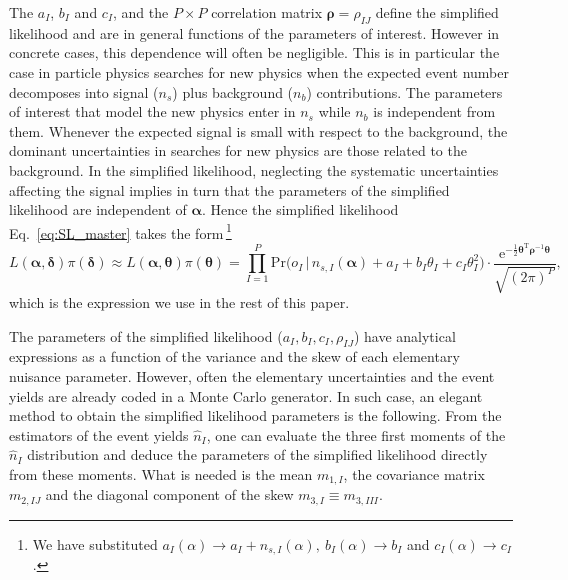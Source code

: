 \documentclass[11pt]{article}
\newcommand{\be}{\begin{equation}}
\newcommand{\ee}{\end{equation}}
\begin{document}
The $a_I$, $b_I$ and $c_I$, and the $P\times P$ correlation matrix $\bm{\rho}=\rho_{IJ}$ define the simplified likelihood and are in general functions of the parameters of interest. However in concrete cases, this dependence will often be negligible. This is in particular the case in particle physics searches for new physics when the expected event number decomposes into signal ($n_s$) plus background ($n_b$) contributions. The parameters of interest that model the new physics enter in $n_s$ while $n_b$ is independent from them.  Whenever the expected signal is small with respect to the background, the dominant uncertainties in searches for new physics are those related to the background.
In the simplified likelihood, neglecting the systematic uncertainties affecting the signal implies in turn that the parameters of the simplified likelihood are independent of $\bm \alpha$. Hence the simplified likelihood Eq.~\eqref{eq:SL_master} takes the form\,\footnote{We have substituted
$a_I(\alpha)\rightarrow a_I+n_{s,I}(\alpha),~b_I(\alpha)\rightarrow b_I$ and $c_I(\alpha)\rightarrow c_I$.}
\be
L(\bm{\alpha},\bm{\delta} )\pi(\bm{\delta})  \approx L(\bm{\alpha},\bm{\theta} )\pi(\bm{\theta}) =
\prod_{I=1}^P \mathrm{Pr}\Big( o_I \, \Big| \, n_{s,I}(\bm{\alpha})+a_I+ b_I\theta_I+c_I\theta_I^2  \Big) \cdot
\frac{ \mathrm{e}^{ \textstyle-\frac{1}{2}\bm{\theta}^\mathrm{T} \bm{\rho}^{-1} \bm{\theta} }}{\sqrt{(2\pi)^P}},
\label{eq:SL_LHC}
\ee
which is the expression we use in the rest of this paper.

The parameters of the simplified likelihood ($a_I, b_I, c_I, \rho_{IJ}$) have analytical expressions
as a function of the variance and the skew  of each elementary nuisance parameter. However, often the elementary uncertainties and the event yields are already coded in a Monte Carlo generator. In such case, %
an elegant method to obtain the simplified likelihood parameters  is the following. From the estimators of the event yields $\hat n_I$, one can evaluate the three first moments of the $\hat n_I$ distribution and deduce the parameters of the simplified likelihood directly from these moments.
What is needed is the mean $m_{1,I}$, the covariance matrix $m_{2,IJ}$ and the diagonal component of the skew $m_{3,I} \equiv m_{3,III}$. %
\end{document}
